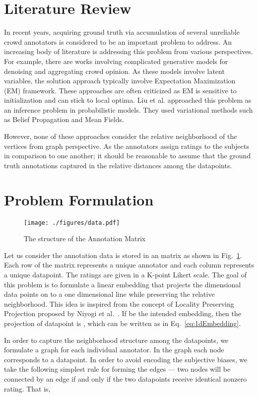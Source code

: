 \documentclass{article} \usepackage{nips14submit_e,times}
\begin{document}
\section{Literature Review}
In recent years, acquiring ground truth via accumulation of several unreliable crowd annotators is considered to be an important problem to address. An increasing body of literature is addressing this problem from various perspectives. For example, there are works involving complicated generative models \cite{Whitehill2009}\cite{Raykar2010} for denoising and aggregating crowd opinion. As these models involve latent variables, the solution approach typically involve Expectation Maximization (EM) \cite{Dempster1977} framework. These approaches are often criticized\cite{Karger2011} as EM is sensitive to initialization and can stick to local optima. Liu et al. \cite{Liu2012} approached this problem as an inference problem in probabilistic models. They used variational methods such as Belief Propagation and Mean Fields. 

However, none of these approaches consider the relative neighborhood of the vertices from graph perspective. As the annotators assign ratings to the subjects in comparison to one another; it should be reasonable to assume that the ground truth annotations captured in the relative distances among the datapoints.

\section{Problem Formulation}\label{sec:probfor}
\begin{figure}
\centering
\texttt{[image: ./figures/data.pdf]}
\caption{The structure of the Annotation Matrix}
\label{Fig:dataStruct}
\end{figure}
Let us consider the annotation data is stored in an  matrix as shown in Fig.~\ref{Fig:dataStruct}. Each row of the matrix represents a unique annotator and each column represents a unique datapoint. The ratings are given in a K-point Likert scale. The goal of this problem is to formulate a linear embedding that projects the  dimensional data points on to a one dimensional line while preserving the relative neighborhood. This idea is inspired from the concept of Locality Preserving Projection proposed by Niyogi et al.~\cite{Niyogi2004}. If  be the intended embedding, then the projection of datapoint  is , which can be written as in Eq.~\eqref{eq:1dEmbedding}. 


In order to capture the neighborhood structure among the datapoints, we formulate a graph for each individual annotator. In the graph each node corresponds to a datapoint. In order to avoid encoding the subjective biases, we take the following simplest rule for forming the edges --- two nodes will be connected by an edge if and only if the two datapoints receive identical nonzero rating.  That is,
\end{document}
